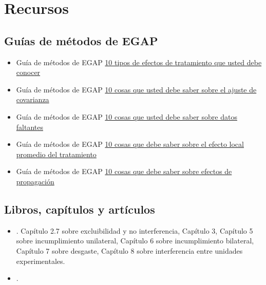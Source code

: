 \documentclass[
  12pt,
  spanish,
]{book}
\begin{document}
\hypertarget{recursos-4}{%
\section{Recursos}\label{recursos-4}}

\hypertarget{guuxedas-de-muxe9todos-de-egap-3}{%
\subsection{Guías de métodos de EGAP}\label{guuxedas-de-muxe9todos-de-egap-3}}

\begin{itemize}
\item
  Guía de métodos de EGAP
  \href{https://egap.org/resource/10-types-of-treatment-effect-you-should-know-about/}{10 tipos de efectos de tratamiento que usted debe conocer}
\item
  Guía de métodos de EGAP \href{https://egap.org/resource/10-things-to-know-about-covariate-adjustment/}{10 cosas que usted debe saber sobre el ajuste de covarianza}
\item
  Guía de métodos de EGAP \href{https://egap.org/resource/10-things-to-know-about-missing-data/}{10 cosas que usted debe saber sobre datos faltantes}
\item
  Guía de métodos de EGAP \href{https://egap.org/resource/10-things-to-know-about-the-local-average-treatment-effect/}{10 cosas que debe saber sobre el efecto local promedio del tratamiento}
\item
  Guía de métodos de EGAP \href{https://egap.org/resource/10-things-to-know-about-spillovers/}{10 cosas que debe saber sobre efectos de propagación}
\end{itemize}

\hypertarget{libros-capuxedtulos-y-artuxedculos-3}{%
\subsection{Libros, capítulos y artículos}\label{libros-capuxedtulos-y-artuxedculos-3}}

\begin{itemize}
\item
  \autocite{gerber_field_2012}. Capítulo 2.7 sobre excluibilidad y no interferencia, Capítulo 3, Capítulo 5 sobre incumplimiento unilateral, Capítulo 6 sobre incumplimiento bilateral, Capítulo 7 sobre desgaste, Capítulo 8 sobre interferencia entre unidades experimentales.
\item
  \autocite{bowers2020causality}.
\end{itemize}
\end{document}
